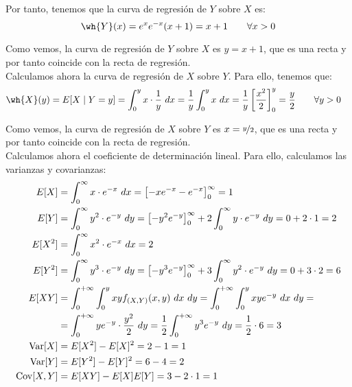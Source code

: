 \begin{ejercicio}
    Por tanto, tenemos que la curva de regresión de $Y$ sobre $X$ es:
    \begin{equation*}
        \wh{Y}(x) = e^xe^{-x}(x+1) = x+1 \qquad \forall x>0
    \end{equation*}

    Como vemos, la curva de regresión de $Y$ sobre $X$ es $y=x+1$, que es una recta y por tanto coincide con la recta de regresión.\\

    Calculamos ahora la curva de regresión de $X$ sobre $Y$. Para ello, tenemos que:
    \begin{align*}
        \wh{X}(y) &= E[X\mid Y=y] = \int_{0}^{y} x\cdot \dfrac{1}{y} \ dx = \dfrac{1}{y}\int_{0}^{y} x \ dx
        = \dfrac{1}{y}\left[\dfrac{x^2}{2}\right]_{0}^{y} = \dfrac{y}{2} \qquad \forall y>0
    \end{align*}

    Como vemos, la curva de regresión de $X$ sobre $Y$ es $x=\nicefrac{y}{2}$, que es una recta y por tanto coincide con la recta de regresión.\\

    Calculamos ahora el coeficiente de determinación lineal. Para ello, calculamos las varianzas y covarianzas:
    \begin{align*}
        E[X] &= \int_{0}^{\infty} x\cdot e^{-x} \ dx = \left[-xe^{-x}-e^{-x}\right]_{0}^{\infty} = 1\\
        E[Y] &= \int_{0}^{\infty} y^2\cdot e^{-y} \ dy = \left[-y^2e^{-y}\right]_{0}^{\infty} +2\int_{0}^{\infty} y\cdot e^{-y} \ dy = 0+2\cdot 1=2\\
        E[X^2] &= \int_{0}^{\infty} x^2\cdot e^{-x} \ dx = 2\\
        E[Y^2] &= \int_{0}^{\infty} y^3\cdot e^{-y} \ dy = \left[-y^3e^{-y}\right]_{0}^{\infty} +3\int_{0}^{\infty} y^2\cdot e^{-y} \ dy = 0+3\cdot 2=6\\
        E[XY] &= \int_0^{+\infty}\int_0^y xy f_{(X,Y)}(x,y) \ dx \ dy
        = \int_0^{+\infty}\int_0^y xy e^{-y} \ dx \ dy
        =\\&= \int_0^{+\infty}y e^{-y}\cdot \dfrac{y^2}{2} \ dy
        = \dfrac{1}{2}\int_0^{+\infty}y^3 e^{-y} \ dy
        = \dfrac{1}{2}\cdot 6 = 3\\
        \Var[X] &= E[X^2]-E[X]^2 = 2-1 = 1\\
        \Var[Y] &= E[Y^2]-E[Y]^2 = 6-4 = 2\\
        \Cov[X,Y] &= E[XY]-E[X]E[Y] = 3-2\cdot 1 = 1
    \end{align*}


\end{ejercicio}
